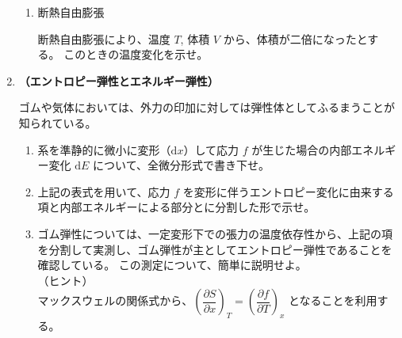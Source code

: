 \documentclass[uplatex,dvipdfmx,a4paper,11pt]{jsarticle}
\newcommand{\diff}{\mathrm d}
\begin{document}
\begin{enumerate}
\begin{enumerate}
%
%

\item
断熱自由膨張

断熱自由膨張により、温度 $T$, 体積 $V$ から、体積が二倍になったとする。
このときの温度変化を示せ。

%

\end{enumerate}

\item
{\bf （エントロピー弾性とエネルギー弾性）}

ゴムや気体においては、外力の印加に対しては弾性体としてふるまうことが知られている。

\begin{enumerate}
\item
系を準静的に微小に変形（$\diff x$）して応力 $f$ が生じた場合の内部エネルギー変化 $\diff E$ について、全微分形式で書き下せ。

\item
上記の表式を用いて、応力 $f$ を変形に伴うエントロピー変化に由来する項と内部エネルギーによる部分とに分割した形で示せ。

\item
ゴム弾性については、一定変形下での張力の温度依存性から、上記の項を分割して実測し、ゴム弾性が主としてエントロピー弾性であることを確認している。
この測定について、簡単に説明せよ。\\
（ヒント）\\
マックスウェルの関係式から、$\left(\dfrac{\partial S}{\partial x} \right)_T = \left(\dfrac{\partial f}{\partial T} \right)_x$ となることを利用する。


\end{enumerate}


\end{enumerate}
\end{document}
